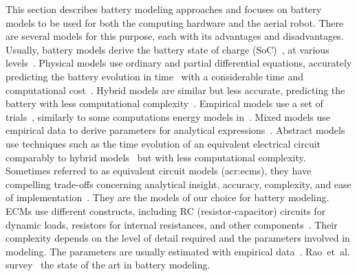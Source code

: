This section describes battery modeling approaches and focuses on battery models to be used for both the computing hardware and the aerial robot. There are several models for this purpose, each with its advantages and disadvantages. Usually, battery models derive the battery state of charge (SoC)~\citep{xia2015state}, at various levels~\citep{sunden2019thermal,kurzweil2018state,kurzweil2021state,deng2017maximum}. Physical models use ordinary and partial differential equations, accurately predicting the battery evolution in time~\citep{rao2003battery} with a considerable time and computational cost~\citep{doyle1993modeling,marcicki2013design,lotfi2017reduced,moura2017battery}. Hybrid models are similar but less accurate, predicting the battery with less computational complexity~\citep{kim2011hybrid,kim2019enhanced}. Empirical models use a set of trials~\citep{syracuse1997statistical,pedram1999design}, similarly to some computations energy models in~. Mixed models use empirical data to derive parameters for analytical expressions~\citep{rao2003battery,rakhmatov2001analytical}. Abstract models use techniques such as the time evolution of an equivalent electrical circuit~\citep{gold1997pspice,benini2001discrete,seongjun2008state,xiaosong2012comparative,xing2014state,hasan2018exogenous} comparably to hybrid models~\citep{kim2011hybrid} but with less computational complexity. Sometimes referred to as equivalent circuit models (\Gls{acr:ecm}s), they have compelling trade-offs concerning analytical insight, accuracy, complexity, and ease of implementation~\citep{rao2003battery}. They are the models of our choice for battery modeling. ECMs use different constructs, including RC (resistor-capacitor) circuits for dynamic loads, resistors for internal resistances, and other components~\citep{hamza2017forecasting}. Their complexity depends on the level of detail required and the parameters involved in modeling. The parameters are usually estimated with empirical data~\citep{zhang2014battery}. Rao~et~al. survey~\citep{rao2003battery} the state of the art in battery modeling.


